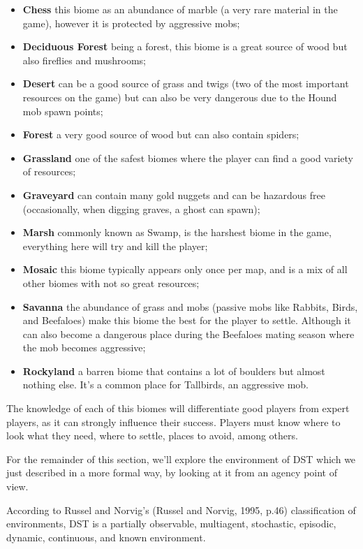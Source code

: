 \begin{itemize}
\item \textbf{Chess} this biome as an abundance of marble (a very rare material in the game), however it is protected by aggressive mobs;
\item \textbf{Deciduous Forest} being a forest, this biome is a great source of wood but also fireflies and mushrooms;
\item \textbf{Desert} can be a good source of grass and twigs (two of the most important resources on the game) but can also be very dangerous due to the Hound mob spawn points;
\item \textbf{Forest} a very good source of wood but can also contain spiders;
\item \textbf{Grassland} one of the safest biomes where the player can find a good variety of resources;
\item \textbf{Graveyard} can contain many gold nuggets and can be hazardous free (occasionally, when digging graves, a ghost can spawn);
\item \textbf{Marsh} commonly known as Swamp, is the harshest biome in the game, everything here will try and kill the player;
\item \textbf{Mosaic} this biome typically appears only once per map, and is a mix of all other biomes with not so great resources;
\item \textbf{Savanna} the abundance of grass and mobs (passive mobs like Rabbits, Birds, and Beefaloes) make this biome the best for the player to settle.
Although it can also become a dangerous place during the Beefaloes mating season where the mob becomes aggressive;
\item \textbf{Rockyland} a barren biome that contains a lot of boulders but almost nothing else. It’s a common place for Tallbirds, an aggressive mob.
\end{itemize}

The knowledge of each of this biomes will differentiate good players from expert players, as it can strongly influence their success.
Players must know where to look what they need, where to settle, places to avoid, among others.

For the remainder of this section, we'll explore the environment of \ac{DST} which we just described in a more formal way, by looking at it from an agency point of view.

According to Russel and Norvig's (Russel and Norvig, 1995, p.46) classification of environments, \ac{DST} is a partially observable, multiagent, stochastic, episodic, dynamic, continuous, and known environment.

